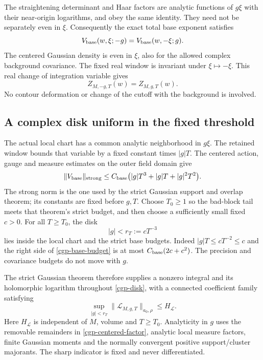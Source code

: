 The straightening determinant and Haar factors are analytic
functions of $g\xi$ with their near-origin logarithms, and obey
the same identity. They need not be separately even in $\xi$.
Consequently the exact total base exponent satisfies
\begin{equation}
             V_{\rm base}(w,\xi;-g)
                    =V_{\rm base}(w,-\xi;g).
 \label{cgp-base-parity}
\end{equation}
The centered Gaussian density is even in $\xi$, also for the
allowed complex background covariance. The fixed real window
is invariant under $\xi\mapsto-\xi$. This real change of
integration variable gives
\begin{equation}
                 Z_{M,-g,T}(w)=Z_{M,g,T}(w).
 \label{cgp-integral-parity}
\end{equation}
No contour deformation or change of the cutoff with the
background is involved.

\subsection{A complex disk uniform in the fixed threshold}
\label{cgp-disk-section}

The actual local chart has a common analytic neighborhood in
$g\xi$. The retained window bounds that variable by a fixed
constant times $|g|T$. The centered action, gauge and measure
estimates on the outer field domain give
\begin{equation}
 \|V_{\rm base}\|_{\rm strong}
   \le C_{\rm base}\bigl(|g|T^3+|g|T+|g|^2T^2\bigr).
 \label{cgp-base-budget}
\end{equation}
The strong norm is the one used by the strict Gaussian
support and overlap theorem; its constants are fixed before
$g,T$. Choose $T_0\ge1$ so the bad-block tail meets that
theorem's strict budget, and then choose a sufficiently
small fixed $c>0$. For all $T\ge T_0$, the disk
\begin{equation}
                         |g|<r_T:=cT^{-3}
 \label{cgp-disk}
\end{equation}
lies inside the local chart and the strict base budgets.
Indeed $|g|T\le cT^{-2}\le c$ and the right side of
\eqref{cgp-base-budget} is at most
$C_{\rm base}(2c+c^2)$. The precision and covariance
budgets do not move with $g$.

The strict Gaussian theorem therefore supplies a nonzero
integral and its holomorphic logarithm throughout
\eqref{cgp-disk}, with a connected coefficient family satisfying
\begin{equation}
             \sup_{|g|<r_T}
               \|\mathcal L_{M,g,T}\|_{a_0,\rho}
                         \le H_{\mathcal L}.
 \label{cgp-uniform-log}
\end{equation}
Here $H_{\mathcal L}$ is independent of $M$, volume and
$T\ge T_0$. Analyticity in $g$ uses the removable remainders
in \eqref{cgp-centered-factor}, analytic local measure factors,
finite Gaussian moments and the normally convergent positive
support/cluster majorants. The sharp indicator is fixed and
never differentiated.

